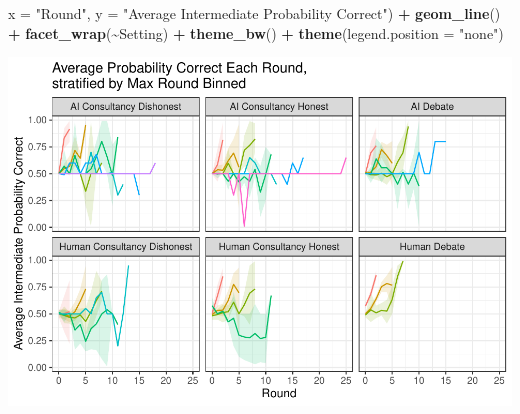 \documentclass[
]{article}
\newenvironment{Shaded}{\begin{snugshade}}{\end{snugshade}}
\newcommand{\AttributeTok}[1]{\textcolor[rgb]{0.13,0.29,0.53}{#1}}
\newcommand{\FunctionTok}[1]{\textcolor[rgb]{0.13,0.29,0.53}{\textbf{#1}}}
\newcommand{\NormalTok}[1]{#1}
\newcommand{\SpecialCharTok}[1]{\textcolor[rgb]{0.81,0.36,0.00}{\textbf{#1}}}
\newcommand{\StringTok}[1]{\textcolor[rgb]{0.31,0.60,0.02}{#1}}
\begin{document}
\begin{Shaded}
\begin{Highlighting}[]
       \AttributeTok{x =} \StringTok{"Round"}\NormalTok{, }
       \AttributeTok{y =} \StringTok{"Average Intermediate Probability Correct"}\NormalTok{) }\SpecialCharTok{+}
  \FunctionTok{geom\_line}\NormalTok{() }\SpecialCharTok{+}
  \FunctionTok{facet\_wrap}\NormalTok{(}\SpecialCharTok{\textasciitilde{}}\NormalTok{Setting) }\SpecialCharTok{+}
  \FunctionTok{theme\_bw}\NormalTok{() }\SpecialCharTok{+}
  \FunctionTok{theme}\NormalTok{(}\AttributeTok{legend.position =} \StringTok{"none"}\NormalTok{)}
\end{Highlighting}
\end{Shaded}

\includegraphics{debate-2309_files/figure-latex/strat ggplot-13.pdf}
\end{document}
